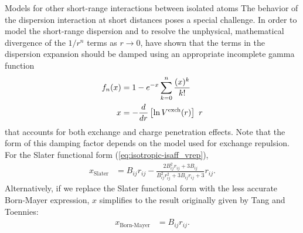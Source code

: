 \begin{subsection}{Models for other short-range interactions between isolated atoms}
The behavior of the dispersion interaction at short distances poses a special
challenge. In order to model the short-range dispersion and to resolve the 
unphysical, mathematical divergence of the ${1}/{r^n}$ terms
as $r \rightarrow 0$, \citeauthor{Tang1984} have shown
that the terms in the dispersion expansion should be damped using an 
appropriate incomplete gamma function 
\begin{align}
\label{eq:isotropic-ttdamp}
f_n(x) &= 1 - e^{-x} \sum \limits_{k=0}^n \frac{(x)^k}{k!} \\
x &= -\frac{d}{dr}\left[\ln V^{\text{exch}}(r)\right] \ r
\end{align}
that accounts for both exchange and charge penetration effects. 
\cite{Tang1984,Tang1992}
Note that the form of this damping factor depends on the model used for
exchange repulsion.
For the Slater functional form (\cref{eq:isotropic-isaff_vrep}),
\begin{align}
\label{eq:isotropic-isaff_ttdamp}
x_{\text{Slater}} &= B_{ij}r_{ij} - \frac{2 B_{ij}^2 r_{ij} + 3 B_{ij} }
{ B_{ij}^2 r_{ij}^2 + 3 B_{ij} r_{ij} + 3} r_{ij}.
\end{align}
Alternatively, if we replace the Slater functional form with the less accurate
Born-Mayer expression, $x$ simplifies to the result originally given by Tang
and Toennies:
\begin{align}
\label{eq:isotropic-saptff_ttdamp}
x_{\text{Born-Mayer}} &= B_{ij}r_{ij} .
\end{align}

\end{subsection}
